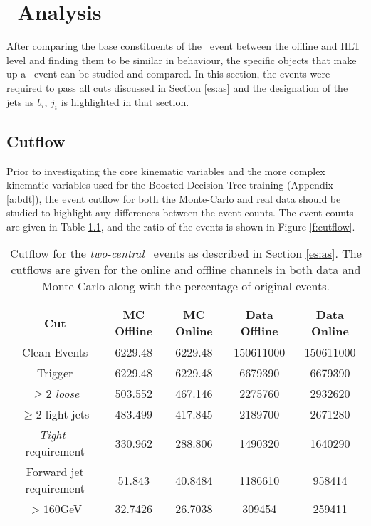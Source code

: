 \chapter{\VBFHBB\, Analysis}\label{c:K}

	After comparing the base constituents of the \VBFHBB\, event between the offline and HLT level and finding them to be similar in behaviour, the specific objects that make up a \VBFHBB\, event can be studied and compared. In this section, the events were required to pass all cuts discussed in Section \ref{es:as} and the designation of the jets as $b_i$, $j_i$ is highlighted in that section.


\section{Cutflow}

	Prior to investigating the core kinematic variables and the more complex kinematic variables used for the Boosted Decision Tree training (Appendix \ref{a:bdt}), the event cutflow for both the Monte-Carlo and real data should be studied to highlight any differences between the event counts. The event counts are given in Table \ref{t:cutflow}, and the ratio of the events is shown in Figure \ref{f:cutflow}.

	\begin{table}[h]
		\caption{Cutflow for the \textit{two-central} \VBFHBB\, events as described in Section \ref{es:as}. The cutflows are given for the online and offline channels in both data and Monte-Carlo along with the percentage of original events.}
		\label{t:cutflow}
		\medskip
		\centering
		\begin{tabular}{c|c|c|c|c}\toprule
			Cut & MC Offline & MC Online & Data Offline & Data Online \\\midrule
			Clean Events & 6229.48 & 6229.48 & 150611000 & 150611000 \\
			Trigger & 6229.48 & 6229.48 & 6679390 &  6679390 \\
			$\geq2$ \textit{loose} \bjets & 503.552  & 467.146 & 2275760 &  2932620 \\
			$\geq2$ light-jets & 483.499  & 417.845 & 2189700 &  2671280 \\
			\textit{Tight} \bjet\, requirement & 330.962  & 288.806 & 1490320 &   1640290 \\
			Forward jet requirement & 51.843   & 40.8484 & 1186610 &  958414  \\
			\ptbb$>160$GeV & 32.7426  & 26.7038 & 309454  &  259411  \\
			\bottomrule
		\end{tabular}
	\end{table}

